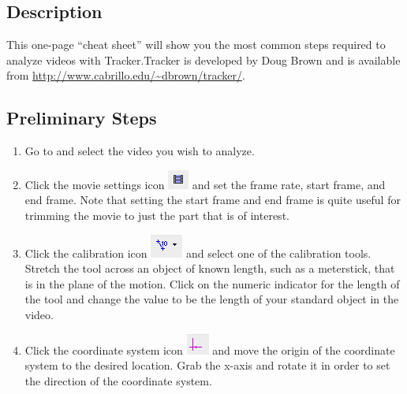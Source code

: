 
\subsection*{Description}

This one-page ``cheat sheet'' will show you the most common steps required to analyze videos with Tracker.Tracker is developed by Doug Brown and is available from \url{http://www.cabrillo.edu/~dbrown/tracker/}.

\subsection*{Preliminary Steps}

\begin{enumerate}
	\item Go to  and select the video you wish to analyze.
	
	
	\item Click the movie settings icon \includegraphics[scale=0.8]{./appendix-tracker/movie-settings} and set the frame rate, start frame, and end frame. Note that setting the start frame and end frame is quite useful for trimming the movie to just the part that is of interest.
	
	\item Click the calibration icon \includegraphics[scale=0.7]{./appendix-tracker/calibration} and select one of the calibration tools. Stretch the tool across an object of known length, such as a meterstick, that is in the plane of the motion. Click on the numeric indicator for the length of the tool and change the value to be the length of your standard object in the video.
	
	\item Click the coordinate system icon \includegraphics[scale=0.7]{./appendix-tracker/coord-sys} and move the origin of the coordinate system to the desired location. Grab the x-axis and rotate it in order to set the direction of the coordinate system. 	
	
\end{enumerate}


